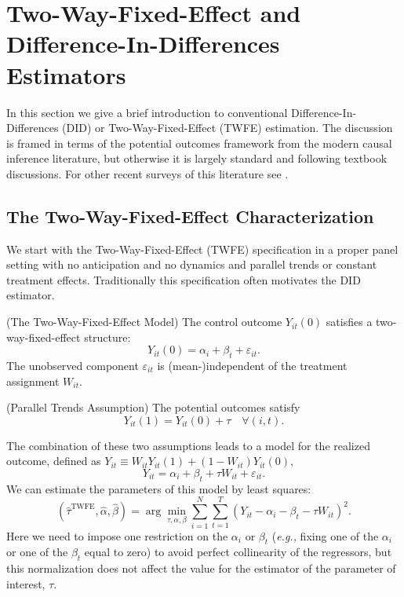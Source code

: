 \documentclass[letterpaper,12pt,leqno]{article}
\newcommand{\twfe}{\mathrm{TWFE}}
\begin{document}
\section{Two-Way-Fixed-Effect  and Difference-In-Differences Estimators}\label{section:twe}



In this section we give a brief introduction to conventional Difference-In-Differences (DID) 
or Two-Way-Fixed-Effect (TWFE) estimation. The discussion is framed in terms of the potential outcomes framework from the modern causal inference literature, but otherwise it is largely standard and following textbook discussions. 
For other recent surveys of this literature see \citep{chiu2023and, de2023two, roth2023s}.

\subsection{The Two-Way-Fixed-Effect Characterization}

We start with the Two-Way-Fixed-Effect (TWFE) specification in a proper panel setting with no anticipation and no dynamics and parallel trends or constant treatment effects. Traditionally this specification often motivates the DID estimator. 
\begin{assumption}\label{ass:twfe}{\sc (The Two-Way-Fixed-Effect Model)}
    The control outcome $Y_{it}(0)$ satisfies a two-way-fixed-effect structure:
\begin{equation}\label{eq:twfe} Y_{it}(0)=\alpha_i+\beta_t+\varepsilon_{it}.\end{equation}
The unobserved component $\varepsilon_{it}$ is (mean-)independent of the treatment assignment $W_{it}$.
\end{assumption}
\begin{assumption}\label{ass:constant}{\sc (Parallel Trends Assumption)}
 The potential outcomes satisfy
\[ Y_{it}(1)=Y_{it}(0)+\tau\quad\forall (i,t).\]
\end{assumption}
The combination of these two assumptions leads to a model for the realized outcome, defined as $Y_{it}\equiv W_{it} Y_{it}(1)+(1-W_{it}) Y_{it}(0)$, 
\begin{equation}\label{eq:twfe_obs} Y_{it}=\alpha_i+\beta_t+\tau W_{it}+\varepsilon_{it}.\end{equation}
We can estimate the parameters of this model by least squares:
\begin{equation}\label{estimator:twfe}
(\hat\tau^\twfe,\hat\alpha,\hat\beta)=\arg\min_{\tau,\alpha,\beta}
\sum_{i=1}^N\sum_{t=1}^T \left( Y_{it}-\alpha_i-\beta_t-\tau W_{it}\right)^2.
\end{equation}
Here we need to impose one restriction on the $\alpha_i$ or $\beta_t$ ({\it e.g.,} fixing one of the $\alpha_i$ or one of the $\beta_t$ equal to zero) to avoid perfect collinearity of the regressors, but this normalization does not affect the value for the estimator of the parameter of interest,  $\tau.$ 
\end{document}

